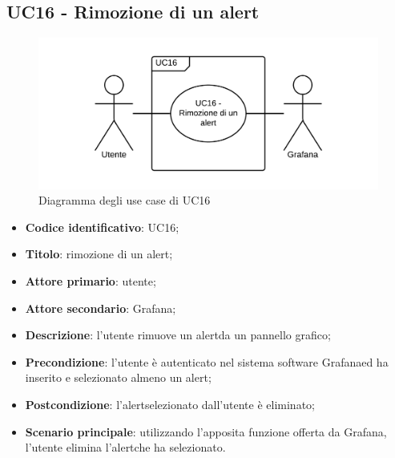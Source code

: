\subsection{UC16 - Rimozione di un alert}
\begin{figure}[H]
\includegraphics{img/UC16_-_Rimozione_di_un_alert.png}
\caption{Diagramma degli use case di UC16}
\end{figure}
\begin{itemize}
	\item \textbf{Codice identificativo}: UC16;
	\item \textbf{Titolo}: rimozione di un alert\glo;
	\item \textbf{Attore primario}: utente;
	\item \textbf{Attore secondario}: Grafana\glo;
	\item \textbf{Descrizione}: l'utente rimuove un alert\glosp da un pannello grafico;
	\item \textbf{Precondizione}: l'utente è autenticato nel sistema software Grafana\glosp ed ha inserito e selezionato almeno un alert\glo;
	\item \textbf{Postcondizione}: l'alert\glosp selezionato dall'utente è eliminato;
	\item \textbf{Scenario principale}: utilizzando l'apposita funzione offerta da Grafana\glo, l'utente elimina l'alert\glosp che ha selezionato.
\end{itemize} 
